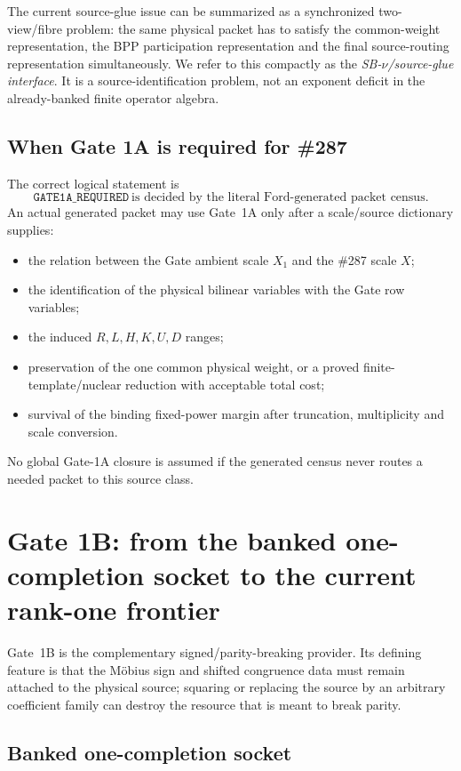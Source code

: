 \documentclass[11pt]{article}
\theoremstyle{definition}
\newcommand{\1}{\mathbf 1}
\begin{document}
{{{The current source-glue issue can be summarized as a synchronized two-view/fibre problem:
the same physical packet has to satisfy the common-weight representation, the BPP
participation representation and the final source-routing representation simultaneously.
We refer to this compactly as the \emph{SB-$\nu$/source-glue interface}.  It is a
source-identification problem, not an exponent deficit in the already-banked finite
operator algebra.

\subsection{When Gate 1A is required for \#287}

The correct logical statement is
\[
\boxed{
\texttt{GATE1A\_REQUIRED}
\ \text{is decided by the literal Ford-generated packet census.}
}
\]
An actual generated packet may use Gate~1A only after a scale/source dictionary supplies:
\begin{itemize}[leftmargin=1.6em]
\item the relation between the Gate ambient scale $X_1$ and the \#287 scale $X$;
\item the identification of the physical bilinear variables with the Gate row variables;
\item the induced $R,L,H,K,U,D$ ranges;
\item preservation of the one common physical weight, or a proved finite-template/nuclear
  reduction with acceptable total cost;
\item survival of the binding fixed-power margin after truncation, multiplicity and
  scale conversion.
\end{itemize}
No global Gate-1A closure is assumed if the generated census never routes a needed packet
to this source class.

\section{Gate 1B: from the banked one-completion socket to the current rank-one frontier}
\label{sec:gate1b-ledger}

Gate~1B is the complementary signed/parity-breaking provider.  Its defining feature is
that the M\"obius sign and shifted congruence data must remain attached to the physical
source; squaring or replacing the source by an arbitrary coefficient family can destroy
the resource that is meant to break parity.

\subsection{Banked one-completion socket}

}}}
\end{document}
